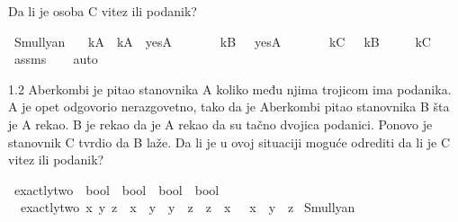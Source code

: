 \begin{isabellebody}
\begin{exercise}[subtitle=Raymond M. Smullyan: Logical Labyrinths]
\begin{isamarkuptext}
          Da li je osoba C vitez ili podanik?%
\end{isamarkuptext}\isamarkuptrue%
\isamarkupfalse%
\ Smullyan{\isacharunderscore}{\kern0pt}{}{\isacharunderscore}{\kern0pt}{}{\isacharcolon}{\kern0pt}\isanewline
\ \ \ {\isachardoublequoteopen}kA\ {\isasymlongleftrightarrow}\ {\isacharparenleft}{\kern0pt}kA\ {\isasymlongleftrightarrow}\ yesA{\isacharparenright}{\kern0pt}{\isachardoublequoteclose}\isanewline
\ \ \ \ \ \ \ {\isachardoublequoteopen}kB\ {\isasymlongleftrightarrow}\ {\isasymnot}\ yesA{\isachardoublequoteclose}\isanewline
\ \ \ \ \ \ \ {\isachardoublequoteopen}kC\ {\isasymlongleftrightarrow}\ {\isasymnot}\ kB{\isachardoublequoteclose}\isanewline
\ \ \ \ \ {\isachardoublequoteopen}kC{\isachardoublequoteclose}\isanewline
%
\isadelimproof
\ \ %
\endisadelimproof
%
\isatagproof
{}\isamarkupfalse%
\ assms\isanewline
\ \ \isamarkupfalse%
\ auto%
\endisatagproof
{\isafoldproof}%
%
\isadelimproof
%
\endisadelimproof
%
\begin{isamarkuptext}%
1.2 Aberkombi je pitao 
          stanovnika A koliko među njima trojicom ima podanika. 
          A je opet odgovorio nerazgovetno,
          tako da je Aberkombi pitao stanovnika B šta je A rekao. 
          B je rekao da je A rekao da su tačno dvojica podanici. 
          Ponovo je stanovnik C tvrdio da B laže. 
          Da li je u ovoj situaciji moguće odrediti da li je C vitez ili podanik?%
\end{isamarkuptext}\isamarkuptrue%
\isamarkupfalse%
\ exactly{\isacharunderscore}{\kern0pt}two\ {\isacharcolon}{\kern0pt}{\isacharcolon}{\kern0pt}\ {\isachardoublequoteopen}bool\ {\isasymRightarrow}\ bool\ {\isasymRightarrow}\ bool\ {\isasymRightarrow}\ bool{\isachardoublequoteclose}\ \isanewline
\ \ {\isachardoublequoteopen}exactly{\isacharunderscore}{\kern0pt}two\ x\ y\ z\ {\isasymlongleftrightarrow}\ {\isacharparenleft}{\kern0pt}{\isacharparenleft}{\kern0pt}x\ {\isasymand}\ y{\isacharparenright}{\kern0pt}\ {\isasymor}\ {\isacharparenleft}{\kern0pt}y\ {\isasymand}\ z{\isacharparenright}{\kern0pt}\ {\isasymor}\ {\isacharparenleft}{\kern0pt}z\ {\isasymand}\ x{\isacharparenright}{\kern0pt}{\isacharparenright}{\kern0pt}\ {\isasymand}\ {\isasymnot}\ {\isacharparenleft}{\kern0pt}x\ {\isasymand}\ y\ {\isasymand}\ z{\isacharparenright}{\kern0pt}{\isachardoublequoteclose}\isanewline
\isanewline
{}\isamarkupfalse%
\ Smullyan{\isacharunderscore}{\kern0pt}{}{\isacharunderscore}{\kern0pt}{}{\isacharcolon}{\kern0pt}\isanewline

\end{exercise}
\end{isabellebody}
